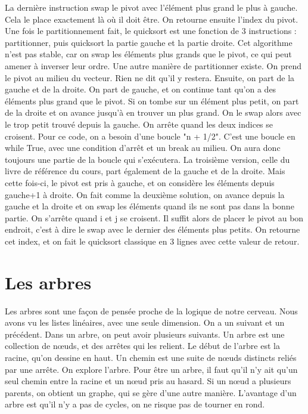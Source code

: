 \documentclass[10pt]{article}
\begin{document}
\newline \newline 
La dernière instruction swap le pivot avec l'élément plus grand le plus à gauche. Cela le place exactement là où il doit être. On retourne ensuite l'index du pivot. 
\newline \newline 
Une fois le partitionnement fait, le quicksort est une fonction de 3 instructions : partitionner, puis quicksort la partie gauche et la partie droite. Cet algorithme n'est pas stable, car on swap les éléments plus grands que le pivot, ce qui peut amener à inverser leur ordre.  
\newline \newline 
Une autre manière de partitionner existe. On prend le pivot au milieu du vecteur. Rien ne dit qu'il y restera. Ensuite, on part de la gauche et de la droite. On part de gauche, et on continue tant qu'on a des éléments plus grand que le pivot. Si on tombe sur un élément plus petit, on part de la droite et on avance jusqu'à en trouver un plus grand. On le swap alors avec le trop petit trouvé depuis la gauche. On arrête quand les deux indices se croisent.  
\newline \newline 
Pour ce code, on a besoin d'une boucle "n + 1/2". C'est une boucle en while True, avec une condition d'arrêt et un break au milieu. On aura donc toujours une partie de la boucle qui s'exécutera.  
\newline \newline 
La troisième version, celle du livre de référence du cours, part également de la gauche et de la droite. Mais cette fois-ci, le pivot est pris à gauche, et on considère les éléments depuis gauche+1 à droite. On fait comme la deuxième solution, on avance depuis la gauche et la droite et on swap les éléments quand ils ne sont pas dans la bonne partie. On s'arrête quand i et j se croisent. Il suffit alors de placer le pivot au bon endroit, c'est à dire le swap avec le dernier des éléments plus petits. On retourne cet index, et on fait le quicksort classique en 3 lignes avec cette valeur de retour. 
\newpage
\section{Les arbres}
Les arbres sont une façon de pensée proche de la logique de notre cerveau. Nous avons vu les listes linéaires, avec une seule dimension. On a un suivant et un précédent. Dans un arbre, on peut avoir plusieurs suivants. 
\newline \newline 
Un arbre est une collection de nœuds, et des arrêtes qui les relient. Le début de l'arbre est la racine, qu'on dessine en haut. Un chemin est une suite de nœuds distincts reliés par une arrête. On explore l'arbre. 
\newline \newline 
Pour être un arbre, il faut qu'il n'y ait qu'un seul chemin entre la racine et un nœud pris au hasard. Si un nœud a plusieurs parents, on obtient un graphe, qui se gère d'une autre manière. L'avantage d'un arbre est qu'il n'y a pas de cycles, on ne risque pas de tourner en rond. 
\end{document}
